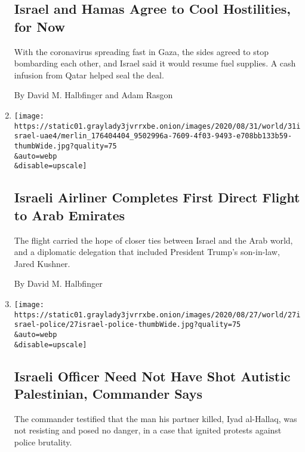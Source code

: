 \begin{enumerate}
  \hypertarget{israel-and-hamas-agree-to-cool-hostilities-for-now}{%
  \subsection{Israel and Hamas Agree to Cool Hostilities, for
  Now}\label{israel-and-hamas-agree-to-cool-hostilities-for-now}}

  With the coronavirus spreading fast in Gaza, the sides agreed to stop
  bombarding each other, and Israel said it would resume fuel supplies.
  A cash infusion from Qatar helped seal the deal.

  By David M. Halbfinger and Adam Rasgon
\item
  \href{/2020/08/31/world/middleeast/israel-uae-flight.html}{}

  \texttt{[image: https://static01.graylady3jvrrxbe.onion/images/2020/08/31/world/31israel-uae4/merlin\_176404404\_9502996a-7609-4f03-9493-e708bb133b59-thumbWide.jpg?quality=75\\\&auto=webp\\\&disable=upscale]}

  \hypertarget{israeli-airliner-completes-first-direct-flight-to-arab-emirates}{%
  \subsection{Israeli Airliner Completes First Direct Flight to Arab
  Emirates}\label{israeli-airliner-completes-first-direct-flight-to-arab-emirates}}

  The flight carried the hope of closer ties between Israel and the Arab
  world, and a diplomatic delegation that included President Trump's
  son-in-law, Jared Kushner.

  By David M. Halbfinger
\item
  \href{/2020/08/27/world/middleeast/israel-police-shooting-palestinian-autism.html}{}

  \texttt{[image: https://static01.graylady3jvrrxbe.onion/images/2020/08/27/world/27israel-police/27israel-police-thumbWide.jpg?quality=75\\\&auto=webp\\\&disable=upscale]}

  \hypertarget{israeli-officer-need-not-have-shot-autistic-palestinian-commander-says}{%
  \subsection{Israeli Officer Need Not Have Shot Autistic Palestinian,
  Commander
  Says}\label{israeli-officer-need-not-have-shot-autistic-palestinian-commander-says}}

  The commander testified that the man his partner killed, Iyad
  al-Hallaq, was not resisting and posed no danger, in a case that
  ignited protests against police brutality.


\end{enumerate}
